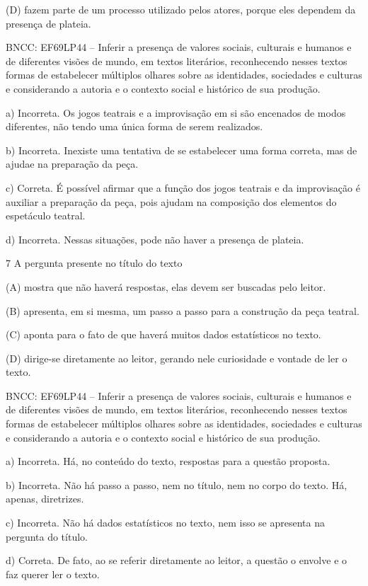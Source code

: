\begin{itemize}
\begin{itemize}
{\begin{itemize}
\begin{itemize}
\begin{escolha}
\begin{escolha}
\begin{escolha}
\begin{escolha}
\begin{escolha}
(D) fazem parte de um processo utilizado pelos atores, porque eles
dependem da presença de plateia.

BNCC: EF69LP44 -- Inferir a presença de valores sociais, culturais e
humanos e de diferentes visões de mundo, em textos literários,
reconhecendo nesses textos formas de estabelecer múltiplos olhares sobre
as identidades, sociedades e culturas e considerando a autoria e o
contexto social e histórico de sua produção.

a) Incorreta. Os jogos teatrais e a improvisação em si são encenados de
modos diferentes, não tendo uma única forma de serem realizados.

b) Incorreta. Inexiste uma tentativa de se estabelecer uma forma
correta, mas de ajudae na preparação da peça.

c) Correta. É possível afirmar que a função dos jogos teatrais e da
improvisação é auxiliar a preparação da peça, pois ajudam na composição
dos elementos do espetáculo teatral.

d) Incorreta. Nessas situações, pode não haver a presença de plateia.

\num{7} A pergunta presente no título do texto

(A) mostra que não haverá respostas, elas devem ser buscadas pelo
leitor.

(B) apresenta, em si mesma, um passo a passo para a construção da peça
teatral.

(C) aponta para o fato de que haverá muitos dados estatísticos no texto.

(D) dirige-se diretamente ao leitor, gerando nele curiosidade e vontade
de ler o texto.

BNCC: EF69LP44 -- Inferir a presença de valores sociais, culturais e
humanos e de diferentes visões de mundo, em textos literários,
reconhecendo nesses textos formas de estabelecer múltiplos olhares sobre
as identidades, sociedades e culturas e considerando a autoria e o
contexto social e histórico de sua produção.

a) Incorreta. Há, no conteúdo do texto, respostas para a questão
proposta.

b) Incorreta. Não há passo a passo, nem no título, nem no corpo do
texto. Há, apenas, diretrizes.

c) Incorreta. Não há dados estatísticos no texto, nem isso se apresenta
na pergunta do título.

d) Correta. De fato, ao se referir diretamente ao leitor, a questão o
envolve e o faz querer ler o texto.


\end{escolha}
\end{escolha}
\end{escolha}
\end{escolha}
\end{escolha}
\end{itemize}
\end{itemize}}
\end{itemize}
\end{itemize}

